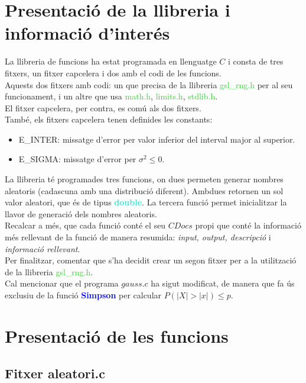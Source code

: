 \documentclass[a4paper, 11pt]{article}
\begin{document}
\section{Presentació de la llibreria i informació d'interés}\label{pres.llib}
La llibreria de funcions ha estat programada en llenguatge $C$ i consta de tres fitxers, un fitxer capcelera i dos amb el codi de les funcions.\\
Aquests dos fitxers amb codi: un que precisa de la llibreria \textcolor{LimeGreen}{gsl\_rng.h} per al seu funcionament, i un altre que usa \textcolor{LimeGreen}{math.h}, \textcolor{LimeGreen}{limits.h}, \textcolor{LimeGreen}{stdlib.h}.\\ 
El fitxer capcelera, per contra, es comú als dos fitxers.\\
També, els fitxers capcelera tenen definides les constants:
\begin{itemize}
    \item \textcolor{Dandelion}{E\_INTER}: missatge d'error per valor inferior del interval major al superior.
    \item \textcolor{Dandelion}{E\_SIGMA}: missatge d'error per $\sigma^2 \leq 0 $.
\end{itemize}
La llibreria té programades tres funcions, on dues permeten generar nombres aleatoris (cadascuna amb una distribució diferent). Ambdues retornen un sol valor aleatori, que és de tipus \textbf{\textcolor{Turquoise}{double}}. La tercera funció permet inicialitzar la llavor de generació dels nombres aleatoris.\\
Recalcar a més, que cada funció conté el seu $CDocs$ propi que conté la informació més rellevant de la funció de manera resumida: \textit{input, output, descripció} i \textit{informació rellevant}.\\ 
Per finalitzar, comentar que s'ha decidit crear un segon fitxer per a la utilització de la llibreria \textcolor{LimeGreen}{gsl\_rng.h}.\\
Cal mencionar que el programa $gauss.c$ ha sigut modificat, de manera que fa ús exclusiu de la funció \textbf{\textcolor{blue}{Simpson}} per calcular $P(|X| > |x|) \leq p$.

\newpage
\section{Presentació de les funcions}
\subsection{Fitxer aleatori.c} \label{aleatori}
\end{document}
